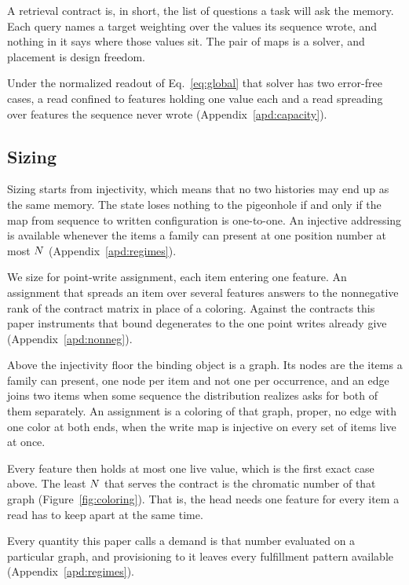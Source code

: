 A retrieval contract is, in short, the list of questions a task will ask the memory. Each query names a target weighting over the values its sequence wrote, and nothing in it says where those values sit. The pair of maps is a solver, and placement is design freedom.

Under the normalized readout of Eq.~\eqref{eq:global} that solver has two error-free cases, a read confined to features holding one value each and a read spreading over features the sequence never wrote (Appendix~\ref{apd:capacity}).


\subsection{Sizing}
\label{sec:sizing}

Sizing starts from injectivity, which means that no two histories may end up as the same memory. The state loses nothing to the pigeonhole if and only if the map from sequence to written configuration is one-to-one. An injective addressing is available whenever the items a family can present at one position number at most $N$ (Appendix~\ref{apd:regimes}).

We size for point-write assignment, each item entering one feature. An assignment that spreads an item over several features answers to the nonnegative rank of the contract matrix in place of a coloring. Against the contracts this paper instruments that bound degenerates to the one point writes already give (Appendix~\ref{apd:nonneg}).

Above the injectivity floor the binding object is a graph. Its nodes are the items a family can present, one node per item and not one per occurrence, and an edge joins two items when some sequence the distribution realizes asks for both of them separately. An assignment is a coloring of that graph, proper, no edge with one color at both ends, when the write map is injective on every set of items live at once.

Every feature then holds at most one live value, which is the first exact case above. The least $N$ that serves the contract is the chromatic number of that graph (Figure~\ref{fig:coloring}). That is, the head needs one feature for every item a read has to keep apart at the same time.

Every quantity this paper calls a demand is that number evaluated on a particular graph, and provisioning to it leaves every fulfillment pattern available (Appendix~\ref{apd:regimes}).

